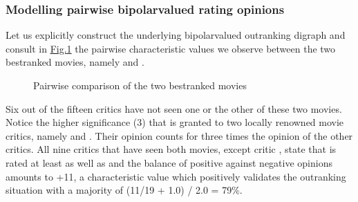 \documentclass[a4paper,12pt,english]{sphinxhowto}
\let\sphinxpxdimen\pdfpxdimen\else\newdimen\sphinxpxdimen
\begin{document}
\subsubsection{Modelling pairwise bipolar\sphinxhyphen{}valued rating opinions}
\label{\detokenize{pearls:modelling-pairwise-bipolar-valued-rating-opinions}}
\sphinxAtStartPar
Let us explicitly construct the underlying bipolar\sphinxhyphen{}valued outranking digraph and consult in \hyperref[\detokenize{pearls:graffiti07-45}]{Fig.\@ \ref{\detokenize{pearls:graffiti07-45}}} the pairwise characteristic values we observe between the two best\sphinxhyphen{}ranked movies, namely  and .

\begin{sphinxVerbatim}[commandchars=\\\{\},numbers=left,firstnumber=1,stepnumber=1]
 
  
 
\end{sphinxVerbatim}

\begin{figure}[H]
\centering
\capstart

\noindent\sphinxincludegraphics[width=600\sphinxpxdimen]{{graffiti07_45}.png}
\caption{Pairwise comparison of the two best\sphinxhyphen{}ranked movies}\label{\detokenize{pearls:graffiti07-45}}\end{figure}

\sphinxAtStartPar
Six out of the fifteen critics have not seen one or the other of these two movies. Notice the higher significance (3) that is granted to two locally renowned movie critics, namely  and . Their opinion counts for three times the opinion of the other critics. All nine critics that have seen both movies, except critic , state that  is rated at least as well as  and the balance of positive against negative opinions amounts to +11, a characteristic value which positively validates the outranking situation with a majority of (11/19 + 1.0) / 2.0 = 79\%.
\end{document}
